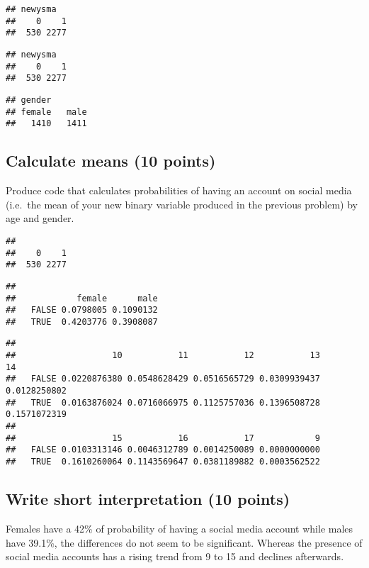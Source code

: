 \documentclass[
]{article}
\begin{document}
\begin{verbatim}
## newysma
##    0    1 
##  530 2277
\end{verbatim}

\begin{verbatim}
## newysma
##    0    1 
##  530 2277
\end{verbatim}

\begin{verbatim}
## gender
## female   male 
##   1410   1411
\end{verbatim}

\hypertarget{calculate-means-10-points}{%
\subsection{Calculate means (10
points)}\label{calculate-means-10-points}}

Produce code that calculates probabilities of having an account on
social media (i.e.~the mean of your new binary variable produced in the
previous problem) by age and gender.

\begin{verbatim}
## 
##    0    1 
##  530 2277
\end{verbatim}

\begin{verbatim}
##        
##            female      male
##   FALSE 0.0798005 0.1090132
##   TRUE  0.4203776 0.3908087
\end{verbatim}

\begin{verbatim}
##        
##                   10           11           12           13           14
##   FALSE 0.0220876380 0.0548628429 0.0516565729 0.0309939437 0.0128250802
##   TRUE  0.0163876024 0.0716066975 0.1125757036 0.1396508728 0.1571072319
##        
##                   15           16           17            9
##   FALSE 0.0103313146 0.0046312789 0.0014250089 0.0000000000
##   TRUE  0.1610260064 0.1143569647 0.0381189882 0.0003562522
\end{verbatim}

\hypertarget{write-short-interpretation-10-points}{%
\subsection{Write short interpretation (10
points)}\label{write-short-interpretation-10-points}}

Females have a 42\% of probability of having a social media account
while males have 39.1\%, the differences do not seem to be significant.
Whereas the presence of social media accounts has a rising trend from 9
to 15 and declines afterwards.
\end{document}
